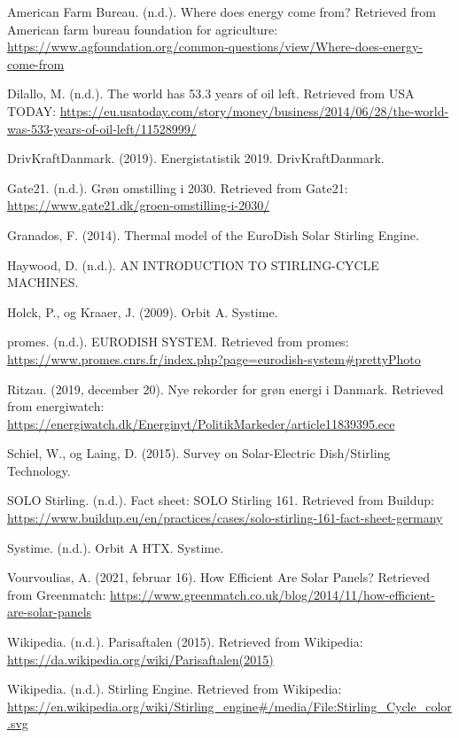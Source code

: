 \documentclass[SRC.tex]{subfiles}
\begin{document}
	​American Farm Bureau. (n.d.). Where does energy come from? Retrieved from American farm bureau foundation for agriculture: \newline \url{https://www.agfoundation.org/common-questions/view/Where-does-energy-come-from}
	
	Dilallo, M. (n.d.). The world has 53.3 years of oil left. Retrieved from USA TODAY: \url{https://eu.usatoday.com/story/money/business/2014/06/28/the-world-was-533-years-of-oil-left/11528999/}
	
	DrivKraftDanmark. (2019). Energistatistik 2019. DrivKraftDanmark. 
	
	Gate21. (n.d.). Grøn omstilling i 2030. Retrieved from Gate21: \url{https://www.gate21.dk/groen-omstilling-i-2030/}
	
	Granados, F. (2014). Thermal model of the EuroDish Solar Stirling Engine.  
	
	Haywood, D. (n.d.). AN INTRODUCTION TO STIRLING-CYCLE MACHINES.  
	
	Holck, P., og Kraaer, J. (2009). Orbit A. Systime. 
	
	promes. (n.d.). EURODISH SYSTEM. Retrieved from promes: \url{https://www.promes.cnrs.fr/index.php?page=eurodish-system#prettyPhoto}
	
	Ritzau. (2019, december 20). Nye rekorder for grøn energi i Danmark. Retrieved from energiwatch: \url{https://energiwatch.dk/Energinyt/PolitikMarkeder/article11839395.ece}
	
	Schiel, W., og Laing, D. (2015). Survey on Solar-Electric Dish/Stirling Technology.  
	
	SOLO Stirling. (n.d.). Fact sheet: SOLO Stirling 161. Retrieved from Buildup: \newline 
	\url{https://www.buildup.eu/en/practices/cases/solo-stirling-161-fact-sheet-germany} 
	
	Systime. (n.d.). Orbit A HTX. Systime. 
	
	Vourvoulias, A. (2021, februar 16). How Efficient Are Solar Panels? Retrieved from Greenmatch: \url{https://www.greenmatch.co.uk/blog/2014/11/how-efficient-are-solar-panels} 
	
	Wikipedia. (n.d.). Parisaftalen (2015). Retrieved from Wikipedia: \newline \url{https://da.wikipedia.org/wiki/Parisaftalen(2015)} 
	
	Wikipedia. (n.d.). Stirling Engine. Retrieved from Wikipedia: \url{https://en.wikipedia.org/wiki/Stirling_engine#/media/File:Stirling_Cycle_color.svg}
\end{document}
